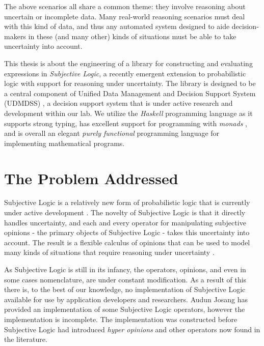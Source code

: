 \documentclass[thesis.tex]{subfiles}
\begin{document}
The above scenarios all share a common theme: they involve reasoning about uncertain or incomplete
data. Many real-world reasoning scenarios must deal with this kind of data, and thus any
automated system designed to aide decision-makers in these (and many other) kinds of situations must be able to take
uncertainty into account.

This thesis is about the engineering of a library for constructing and evaluating expressions in
\emph{Subjective Logic}, a recently emergent extension to probabilistic logic \cite{josang2001logic}
with support for reasoning under uncertainty.
The library is designed to be a central component of Unified Data Management
and Decision Support System (UDMDSS) \cite{kent2010towards,  kobti2011towards, kent2011design},
a decision support system that is under active research and development within our lab. We utilize the
\emph{Haskell} programming language \cite{hudak1992report} as it supports strong typing, has
excellent support for programming with \emph{monads} \cite{peyton1993imperative}, and is overall an
elegant \emph{purely functional} programming language for implementing mathematical programs.





\section{The Problem Addressed}

Subjective Logic is a relatively new form of probabilistic logic that is currently
under active development \cite{josang2001logic}. The novelty of Subjective Logic is that it
directly handles uncertainty, and each and every operator for manipulating
subjective opinions - the primary objects of Subjective Logic -
takes this uncertainty into account. The result is a
flexible calculus of opinions that can be used to model many kinds of
situations that require reasoning under uncertainty \cite{pope2005analysis, josang2006trust, li2004trust, oren2007subjective}.

As Subjective Logic is still in its infancy, the operators, opinions, and
even in some cases nomenclature, are under constant modification. As a result of this
there is, to the best of our knowledge, no implementation of Subjective
Logic available for use by application developers and researchers.
Audun Josang has provided an implementation of some Subjective Logic operators,
however the implementation is incomplete. The implementation was constructed before
Subjective Logic had introduced \emph{hyper opinions} and other operators now found
in the literature.
\end{document}
